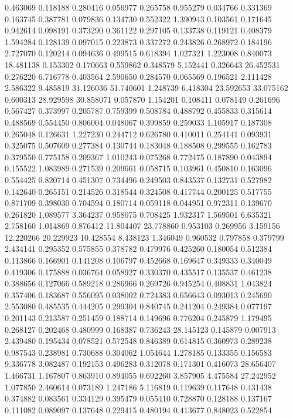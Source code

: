 0.463069
0.118188
0.280416
0.056977
0.265758
0.955279
0.034766
0.331369
0.163745
0.387781
0.079836
0.134730
0.552322
1.390943
0.103561
0.171645
0.942614
0.098191
0.373290
0.361122
0.297105
0.133738
0.119121
0.408379
1.594284
0.128139
0.097015
0.223873
0.337272
0.243826
0.268972
0.184196
2.727070
0.120214
0.094636
0.499515
0.618394
1.027321
1.223008
0.840073
18.481138
0.153302
0.170663
0.559862
0.348579
5.152441
0.326643
26.452531
0.276220
6.716778
0.403564
2.590650
0.284570
0.065569
0.196521
2.111428
2.586322
9.485819
31.126036
51.740601
1.248739
6.418304
23.592653
33.075162
0.600313
28.929598
30.858071
0.057870
1.154201
0.108411
0.078149
0.261696
0.567427
0.373997
0.205787
0.759399
0.508784
0.488792
0.455833
0.315614
0.488569
0.554450
0.806004
0.048067
0.399859
0.259033
1.105917
0.187308
0.265048
0.126631
1.227230
0.244712
0.626780
0.410011
0.254141
0.093931
0.325075
0.507609
0.277384
0.130744
0.183048
0.188508
0.299555
0.162783
0.379550
0.775158
0.209367
1.010243
0.075268
0.772475
0.187890
0.043894
0.155522
1.083989
0.271539
0.209661
0.058715
0.103961
0.450810
0.163096
0.554425
0.820714
0.451307
0.734496
0.249503
0.843537
0.132731
0.527982
0.142640
0.265151
0.214526
0.318544
0.324508
0.417744
0.200125
0.517755
0.871709
0.398030
0.704594
0.180714
0.059118
0.044951
0.972311
0.139670
0.261820
1.089577
3.364237
0.958075
0.708425
1.932317
1.569501
6.635321
2.758160
1.014869
0.876412
11.804407
23.778860
0.953103
0.269956
3.159156
12.220266
20.229923
10.428554
8.438123
1.346049
0.960532
0.797858
0.379799
2.434141
0.295352
0.575855
0.378782
0.479976
0.425260
0.180054
0.512384
0.113866
0.166901
0.141208
0.106797
0.452668
0.169647
0.349333
0.340049
0.419306
0.175888
0.036764
0.058927
0.330370
0.435517
0.135537
0.461238
0.388656
0.127066
0.589218
0.286966
0.269726
0.945254
0.408831
1.043824
0.357406
0.183687
0.556095
0.038002
0.724383
0.656643
0.093013
0.245690
2.553080
0.485535
0.444205
0.299304
0.840745
0.241204
0.249384
0.077197
0.201143
0.213587
0.251459
0.188714
0.149696
0.776204
0.245879
1.179495
0.268127
0.202468
0.480999
0.168387
0.736243
28.145123
0.145879
0.007913
2.439480
0.195434
0.078521
0.572548
0.846389
0.614815
0.360973
0.289238
0.987543
0.238981
0.730688
0.304062
1.054644
1.278185
0.133355
0.156583
9.336778
3.082487
0.192153
0.496283
0.312078
0.171301
0.416073
28.656407
1.466731
1.167807
0.863910
0.894055
0.692260
3.857905
4.475584
27.242952
1.077850
2.460614
0.073189
1.247186
5.116819
0.119639
0.117648
0.431438
0.374882
0.083561
0.334129
0.395479
0.055410
0.728870
0.128188
0.137167
0.111082
0.089097
0.137648
0.229415
0.480194
0.413677
0.848023
0.522854
